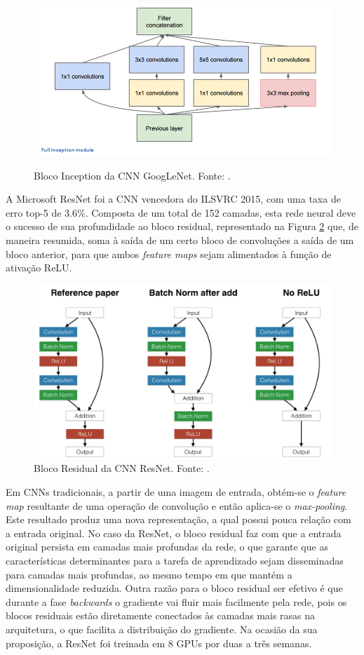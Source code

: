 \begin{figure}[h!]
	\centering
	\caption{Bloco Inception da CNN GoogLeNet. Fonte: \cite{9dlpapers}.}
	\includegraphics[width=0.7\linewidth]{img/GoogLeNet}
	\label{fig:bloco_inception}
\end{figure}



A Microsoft ResNet foi a CNN vencedora do ILSVRC 2015, com uma taxa de erro top-5 de $3.6\%$. Composta de um total de 152 camadas, esta rede neural deve o sucesso de sua profundidade ao bloco residual, representado na Figura \ref{fig:bloco_residual} que, de maneira resumida, soma à saída de um certo bloco de convoluções a saída de um bloco anterior, para que ambos \emph{feature maps} sejam alimentados à função de ativação ReLU. 

\begin{figure}[h!]
\centering
\caption{Bloco Residual da CNN ResNet. Fonte: \cite{torch:resnet}.}\label{fig:bloco_residual}
\includegraphics[width=0.7\linewidth]{img/resnets_modelvariants}
\end{figure}

Em CNNs tradicionais, a partir de uma imagem de entrada, obtém-se o  \emph{feature map}  resultante de uma operação de convolução e então aplica-se o \emph{max-pooling}. Este resultado produz uma nova representação, a qual possui pouca relação com a entrada original. No caso da ResNet, o bloco residual faz com que a entrada original persista em camadas mais profundas da rede, o que garante que as características determinantes para a tarefa de aprendizado sejam disseminadas para camadas mais profundas, ao mesmo tempo em que mantém a dimensionalidade reduzida. Outra razão para o bloco residual ser efetivo é que durante a fase \emph{backwards} o gradiente vai fluir mais facilmente pela rede, pois os blocos residuais estão diretamente conectados às camadas mais rasas na arquitetura, o que facilita a distribuição do gradiente. Na ocasião da sua proposição, a ResNet foi treinada em 8 GPUs por duas a três semanas. 

